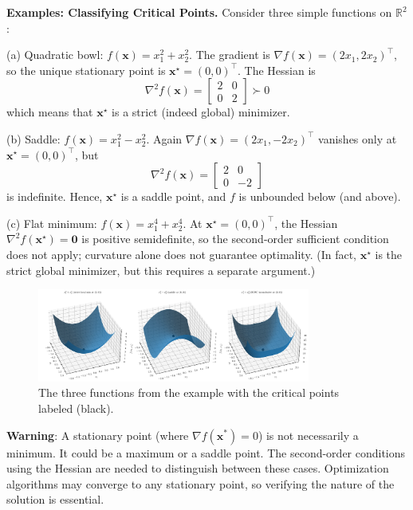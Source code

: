 \begin{exampleBox}
    \textbf{Examples: Classifying Critical Points.}
    Consider three simple functions on $\mathbb{R}^2$:
    
    (a) Quadratic bowl: $f(\mathbf{x})=x_1^2+x_2^2$. The gradient is $\nabla f(\mathbf{x})=(2x_1,2x_2)^\top$, so the unique stationary point is $\mathbf{x}^\star=(0,0)^\top$. The Hessian is
    \[
    \nabla^2 f(\mathbf{x})=\begin{bmatrix}2&0\\0&2\end{bmatrix}\succ 0
    \]
    which means that $\mathbf{x}^\star$ is a strict (indeed global) minimizer.
    
    (b) Saddle: $f(\mathbf{x})=x_1^2-x_2^2$. Again $\nabla f(\mathbf{x})=(2x_1,-2x_2)^\top$ vanishes only at $\mathbf{x}^\star=(0,0)^\top$, but
    \[
    \nabla^2 f(\mathbf{x})=\begin{bmatrix}2&0\\0&-2\end{bmatrix}
    \]
    is indefinite. Hence, $\mathbf{x}^\star$ is a saddle point, and $f$ is unbounded below (and above).
    
    (c) Flat minimum: $f(\mathbf{x})=x_1^4+x_2^4$. At $\mathbf{x}^\star=(0,0)^\top$, the Hessian $\nabla^2 f(\mathbf{x}^\star)=\mathbf{0}$ is positive semidefinite, so the second-order sufficient condition does not apply; curvature alone does not guarantee optimality. (In fact, $\mathbf{x}^\star$ is the strict global minimizer, but this requires a separate argument.)

    \begin{figure}[H]
        \centering
        \includegraphics[width=0.8\textwidth]{figs/optimization/critical_points.pdf}
        \caption{The three functions from the example with the critical points labeled (black).}
        \label{fig:optimality-conditions}
    \end{figure}
    \end{exampleBox}


\begin{warningBox}
    \textbf{Warning}: A stationary point (where $\nabla f(\mathbf{x}^*) = 0$) is not necessarily a minimum. It could be a maximum or a saddle point. The second-order conditions using the Hessian are needed to distinguish between these cases. Optimization algorithms may converge to any stationary point, so verifying the nature of the solution is essential.
\end{warningBox}

